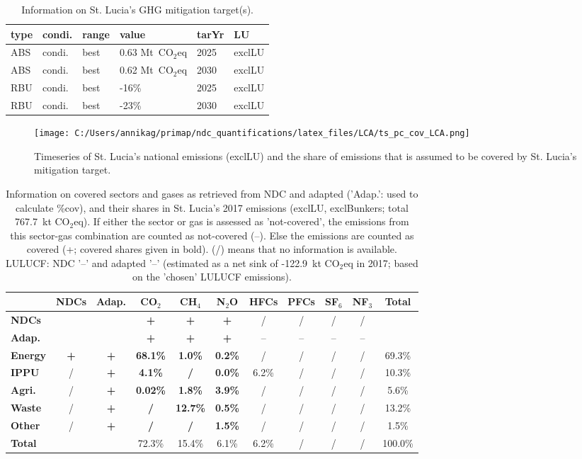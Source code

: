 \documentclass[12pt]{article}
\begin{document}
 \begin{table}[H]
 \centering
 \caption{Information on St. Lucia's GHG mitigation target(s).}
 \label{tab:mitiTars}
 \begin{tabular}{l l l l l l }
 \bfseries type & \bfseries condi. & \bfseries range & \bfseries value & \bfseries tarYr & \bfseries LU \tabularnewline \hline \hline
 ABS & condi. & best & 0.63 Mt~CO$_2$eq & 2025 & exclLU \tabularnewline 
 ABS & condi. & best & 0.62 Mt~CO$_2$eq & 2030 & exclLU \tabularnewline \hline
 RBU & condi. & best & -16\% & 2025 & exclLU \tabularnewline 
 RBU & condi. & best & -23\% & 2030 & exclLU \tabularnewline 
 \end{tabular}
 \end{table}

 \begin{figure}[H]
 \centering
 \texttt{[image: C:/Users/annikag/primap/ndc\_quantifications/latex\_files/LCA/ts\_pc\_cov\_LCA.png]}
 \caption{Timeseries of St. Lucia's national emissions (exclLU) and the share of emissions that is assumed to be covered by St. Lucia's mitigation target.}
 \label{fig:tsPcCov}
 \end{figure}

 \begin{table}[H]\small
 \centering
 \caption{Information on covered sectors and gases as retrieved from NDC and adapted ('Adap.': used to calculate \%cov), and their shares in St. Lucia's 2017 emissions (exclLU, exclBunkers; total 767.7~kt CO$_2$eq).
 If either the sector or gas is assessed as 'not-covered', the emissions from this sector-gas combination are counted as not-covered (--). 
 Else the emissions are counted as covered (+; covered shares given in bold).
 (/) means that no information is available.
 LULUCF: NDC '--' and adapted '--' (estimated as a net sink of -122.9~kt CO$_2$eq in 2017; based on the 'chosen' LULUCF emissions).}
 \label{tab:coveredSectorsGases}
 \begin{tabular}{l || c c || c c c c c c c | c}
 \bfseries  & \bfseries NDCs & \bfseries Adap. & \bfseries CO$_2$ & \bfseries CH$_4$ & \bfseries N$_2$O & \bfseries HFCs & \bfseries PFCs & \bfseries SF$_6$ & \bfseries NF$_3$ & \bfseries Total \tabularnewline \hline \hline
 \bfseries NDCs &  &  & \bfseries + & \bfseries + & \bfseries + & / & / & / & / &  \tabularnewline 
 \bfseries Adap. &  &  & \bfseries + & \bfseries + & \bfseries + & -- & -- & -- & -- &  \tabularnewline \hline \hline
 \bfseries Energy & \bfseries + & \bfseries + & \bfseries 68.1\% & \bfseries 1.0\% & \bfseries 0.2\% & / & / & / & / & 69.3\% \tabularnewline 
 \bfseries IPPU & / & \bfseries + & \bfseries 4.1\% & \bfseries / & \bfseries 0.0\% & 6.2\% & / & / & / & 10.3\% \tabularnewline 
 \bfseries Agri. & / & \bfseries + & \bfseries 0.02\% & \bfseries 1.8\% & \bfseries 3.9\% & / & / & / & / & 5.6\% \tabularnewline 
 \bfseries Waste & / & \bfseries + & \bfseries / & \bfseries 12.7\% & \bfseries 0.5\% & / & / & / & / & 13.2\% \tabularnewline 
 \bfseries Other & / & \bfseries + & \bfseries / & \bfseries / & \bfseries 1.5\% & / & / & / & / & 1.5\% \tabularnewline \hline
 \bfseries Total &  &  & 72.3\% & 15.4\% & 6.1\% & 6.2\% & / & / & / & 100.0\% \tabularnewline 
 \end{tabular}
 \end{table}
\end{document}
